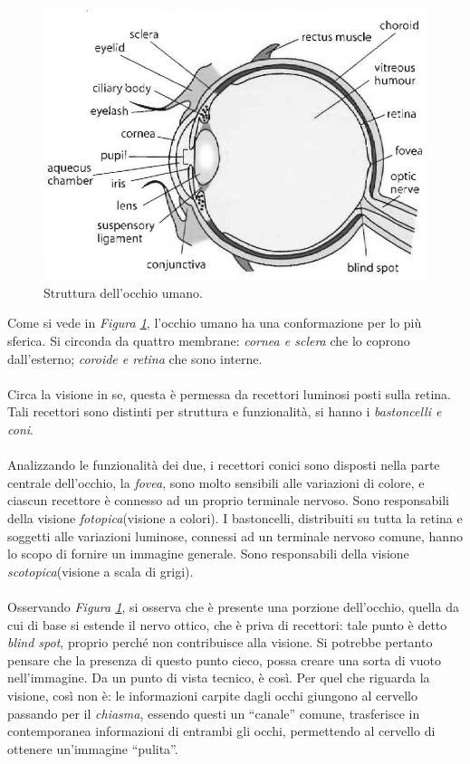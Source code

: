 \documentclass{subfiles}
\begin{document}
\begin{figure}
    \includegraphics[scale = 0.425]{Images/Human Eye.png}
    \caption{Struttura dell'occhio umano.}
    \label{Fig:1.1}
\end{figure}

Come si vede in \emph{Figura \ref{Fig:1.1}}, l'occhio umano ha una conformazione per lo più sferica.
Si circonda da quattro membrane: \emph{cornea \emph{e} sclera} che lo coprono dall'esterno; \emph{coroide \emph{e} retina} che sono interne.
\\ \\
Circa la visione in se, questa è permessa da recettori luminosi posti sulla retina.
Tali recettori sono distinti per struttura e funzionalità, si hanno i \emph{bastoncelli \emph{e} coni}.
\\ \\
Analizzando le funzionalità dei due, i recettori conici sono disposti nella parte centrale dell'occhio, la \emph{fovea}, sono molto sensibili alle variazioni di colore,
e ciascun recettore è connesso ad un proprio terminale nervoso. Sono responsabili della visione \emph{fotopica}(visione a colori).
I bastoncelli, distribuiti su tutta la retina e soggetti alle variazioni luminose, connessi ad un terminale nervoso comune, hanno lo scopo di fornire un immagine generale.
Sono responsabili della visione \emph{scotopica}(visione a scala di grigi).
\\ \\
Osservando \emph{Figura \ref{Fig:1.1}}, si osserva che è presente una porzione dell'occhio, quella da cui di base si estende il nervo ottico,
che è priva di recettori: tale punto è detto \emph{blind spot}, proprio perché non contribuisce alla visione.
Si potrebbe pertanto pensare che la presenza di questo punto cieco, possa creare una sorta di vuoto nell'immagine.
Da un punto di vista tecnico, è così. Per quel che riguarda la visione, così non è: le informazioni carpite dagli occhi giungono al cervello passando per il \emph{chiasma},
essendo questi un ``canale'' comune, trasferisce in contemporanea informazioni di entrambi gli occhi, permettendo al cervello di ottenere un'immagine ``pulita''.
\end{document}
